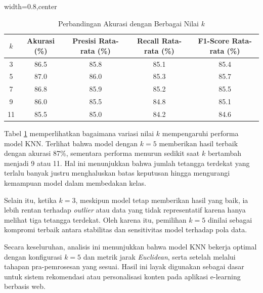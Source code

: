 \begin{table}[H]
\centering
\caption{Perbandingan Akurasi dengan Berbagai Nilai $ k $}
\label{tab:k_comparison}
\small %
\begin{adjustbox}{width=0.8\textwidth,center}
\begin{tabular}{|c|c|c|c|c|}
\hline
$ k $ & \textbf{Akurasi (\%)} & \textbf{Presisi Rata-rata (\%)} & \textbf{Recall Rata-rata (\%)} & \textbf{F1-Score Rata-rata (\%)} \\
\hline
3   & 86.5    & 85.8    & 85.1    & 85.4 \\
5   & 87.0    & 86.0    & 85.3    & 85.7 \\
7   & 86.8    & 85.9    & 85.2    & 85.5 \\
9   & 86.0    & 85.5    & 84.8    & 85.1 \\
11  & 85.5    & 85.0    & 84.2    & 84.6 \\
\hline
\end{tabular}
\end{adjustbox}
\end{table}
Tabel \ref{tab:k_comparison} memperlihatkan bagaimana variasi nilai $k$ mempengaruhi performa model KNN. Terlihat bahwa model dengan $k=5$ memberikan hasil terbaik dengan akurasi 87\%, sementara performa menurun sedikit saat $k$ bertambah menjadi 9 atau 11. Hal ini menunjukkan bahwa jumlah tetangga terdekat yang terlalu banyak justru menghaluskan batas keputusan hingga mengurangi kemampuan model dalam membedakan kelas.
\par Selain itu, ketika $k=3$, meskipun model tetap memberikan hasil yang baik, ia lebih rentan terhadap \textit{outlier} atau data yang tidak representatif karena hanya melihat tiga tetangga terdekat. Oleh karena itu, pemilihan $k=5$ dinilai sebagai kompromi terbaik antara stabilitas dan sensitivitas model terhadap pola data.
\par Secara keseluruhan, analisis ini menunjukkan bahwa model KNN bekerja optimal dengan konfigurasi $k=5$ dan metrik jarak \textit{Euclidean}, serta setelah melalui tahapan pra-pemrosesan yang sesuai. Hasil ini layak digunakan sebagai dasar untuk sistem rekomendasi atau personalisasi konten pada aplikasi e-learning berbasis web.



